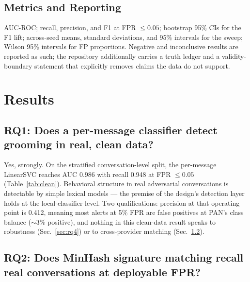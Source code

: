 \documentclass[11pt]{article}
\begin{document}
\subsection{Metrics and Reporting}
AUC-ROC; recall, precision, and F1 at FPR $\leq 0.05$; bootstrap 95\% CIs for the F1 lift; across-seed means, standard deviations, and 95\% intervals for the sweep; Wilson 95\% intervals for FP proportions. Negative and inconclusive results are reported as such; the repository additionally carries a truth ledger and a validity-boundary statement that explicitly removes claims the data do not support.

\section{Results}
\label{sec:results}

\subsection{RQ1: Does a per-message classifier detect grooming in real, clean data?}
\label{sec:rq1}

Yes, strongly. On the stratified conversation-level split, the per-message LinearSVC reaches AUC 0.986 with recall 0.948 at FPR $\leq 0.05$ (Table~\ref{tab:clean}). Behavioral structure in real adversarial conversations is detectable by simple lexical models --- the premise of the design's detection layer holds at the local-classifier level. Two qualifications: precision at that operating point is 0.412, meaning most alerts at 5\% FPR are false positives at PAN's class balance ($\sim$3\% positive), and nothing in this clean-data result speaks to robustness (Sec.~\ref{sec:rq4}) or to cross-provider matching (Sec.~\ref{sec:rq2}).

\begin{table}[!htbp]
\centering
\footnotesize

\caption{Clean-data detection on PAN 2012 (stratified conversation-level 80/20 split; recall/precision/F1 at FPR $\leq 0.05$). Source: \texttt{trajectory\_lift.json}.}
\label{tab:clean}
\end{table}

\subsection{RQ2: Does MinHash signature matching recall real conversations at deployable FPR?}
\label{sec:rq2}
\end{document}
